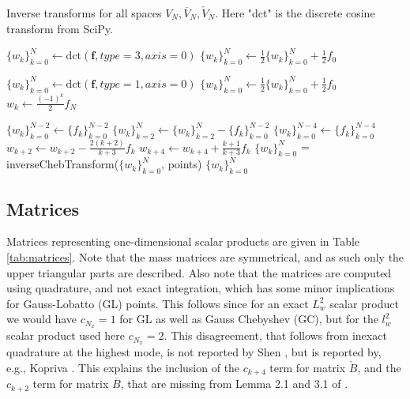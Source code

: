 \documentclass[11pt, oneside]{elsarticle}
\newcommand{\N}[1]{\check{#1}}
\newcommand{\D}[1]{\overline{#1}}
\begin{document}
\begin{algorithm}
	\caption{Inverse transforms for all spaces $V_N, \D{V}_N, \N{V}_N$. 
		Here "dct" is the discrete cosine transform from SciPy.}
	\label{alg:ifst}
	\begin{algorithmic}[1]
		    \State $\{w_k\}_{k=0}^{N} \gets \text{dct}(\bm{f}, type=3, axis=0)$
		    \State $\{w_k\}_{k=0}^{N} \gets \frac{1}{2}\{w_k\}_{k=0}^{N} + \frac{1}{2}f_0$
		    
	        \State $\{w_k\}_{k=0}^{N} \gets \text{dct}(\bm{f}, type=1, axis=0)$
	        \State $\{w_k\}_{k=0}^{N} \gets \frac{1}{2}\{w_k\}_{k=0}^{N} + \frac{1}{2}f_0$
	         \State $w_k \gets \frac{(-1)^k}{2} f_N$
	        \EndFor
	    \EndIf
	    \State {}
	    
	    \EndFunction
		
		
		\If{ space = $\D{V}_N$}
		\State $\{w_k\}_{k=0}^{N-2} \gets \{f_k\}_{k=0}^{N-2}$
		\State $\{w_k\}_{k=2}^{N} \gets \{w_k\}_{k=2}^{N} - \{f_k\}_{k=0}^{N-2} $
        \ElsIf{ space = $\N{V}_N$}	                
		\State $\{w_k\}_{k=0}^{N-4} \gets \{f_k\}_{k=0}^{N-4}$
		\State $w_{k+2} \gets w_{k+2} - \frac{2(k+2)}{k+3} f_k$
		\EndFor
		\State $w_{k+4} \gets w_{k+4} + \frac{k+1}{k+3} f_k$
		\EndFor
        \EndIf
        \State $\{{w}_k\}_{k=0}^{N}$ = inverseChebTransform($\{w_k\}_{k=0}^N$, points)
		\State \Return $\{{w}_k\}_{k=0}^{N}$
		\EndFunction
	\end{algorithmic}
\end{algorithm}

\subsection*{Matrices}

Matrices representing one-dimensional scalar products are given in Table \ref{tab:matrices}. Note that the mass matrices are symmetrical, and as such only the upper triangular parts are described. Also note that the matrices are computed using quadrature, and not exact integration, which has some minor implications for Gauss-Lobatto (GL) points. This follows since for an exact $L^2_w$ scalar product we would have $c_{N_x}=1$ for GL as well as Gauss Chebyshev (GC), but for the $l^2_w$ scalar product used here $c_{N_x}=2$. This disagreement, that follows from inexact quadrature at the highest mode, is not reported by Shen \cite{Shen95}, but is reported by, e.g., Kopriva \cite{kopriva09}. This explains the inclusion of the $c_{k+4}$ term for matrix $\N{B}$, and the $c_{k+2}$ term for matrix $\D{B}$, that are missing from Lemma 2.1 and 3.1 of \cite{Shen95}.
\end{document}
